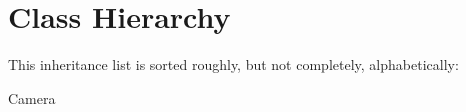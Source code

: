 \section{Class Hierarchy}
This inheritance list is sorted roughly, but not completely, alphabetically\-:\begin{DoxyCompactList}
\item Camera\begin{DoxyCompactList}
\item {}
\end{DoxyCompactList}
\end{DoxyCompactList}
